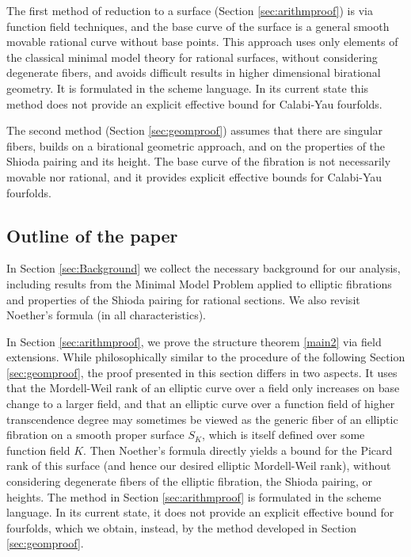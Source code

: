 \documentclass[11pt]{amsart}
\theoremstyle{definition}
\theoremstyle{definition}
\theoremstyle{remark}
\theoremstyle{remark}
\theoremstyle{definition}
\theoremstyle{conjecture}
\begin{document}
  
The first method  of reduction to a surface (Section \ref{sec:arithmproof}) is via function field techniques,  and the base curve of the surface is a  general smooth movable rational curve without base points. This approach uses only elements of the classical minimal model theory for rational surfaces, without
considering degenerate fibers, and avoids difficult results in higher dimensional birational geometry. It is formulated in the scheme language. In its current state this method does not provide an explicit effective bound for Calabi-Yau fourfolds.

The second  method (Section \ref{sec:geomproof}) assumes that there are singular fibers, builds on a birational geometric approach, and  on the properties of the Shioda pairing and its height. The base curve of the fibration is not necessarily movable nor rational, and it provides  explicit effective bounds for  Calabi-Yau fourfolds.

 

\subsection{Outline of the  paper}
 
 In Section \ref{sec:Background} we collect the necessary background for our analysis, including results from the Minimal Model Problem applied to elliptic fibrations and properties of the Shioda pairing for rational sections. We also revisit Noether's formula (in all characteristics).

 

In Section \ref{sec:arithmproof}, we prove the structure theorem \ref{main2} via field extensions. 
While philosophically similar to the procedure of the following Section \ref{sec:geomproof}, the proof presented in this section differs in two aspects. It uses that the Mordell-Weil rank of an elliptic curve over a field only increases
on base change to a larger field, and that an elliptic curve over a function field of higher transcendence degree may sometimes be viewed as the generic fiber of an elliptic fibration on a smooth proper surface $S_K$, which is itself defined over some function field $K$. Then Noether's formula directly yields a bound for the Picard rank of this surface (and hence our desired elliptic Mordell-Weil rank), without considering degenerate fibers of the elliptic fibration, the Shioda pairing, or heights.  
The method in Section \ref{sec:arithmproof} is formulated in the scheme language. 
  In its current state, it does not provide an explicit effective bound for fourfolds, which we obtain, instead, by the method developed in Section \ref{sec:geomproof}. 
\end{document}
